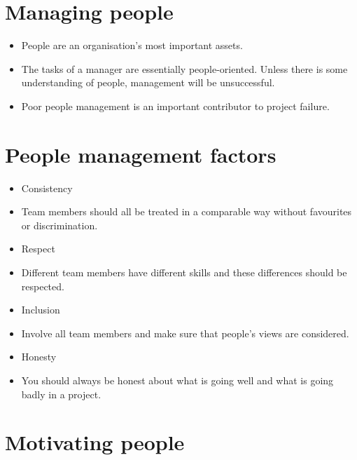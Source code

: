 \section{ Managing people}
\begin{itemize}

\item People are an organisation’s most important assets.

\item The tasks of a manager are essentially people-oriented. Unless there is some understanding of people, management will be unsuccessful.

\item Poor people management is an important contributor to project failure.
\end{itemize} \section{ People management factors}
\begin{itemize}

\item Consistency

  \item Team members should all be treated in a comparable way without favourites or discrimination.

\item Respect

  \item Different team members have different skills and these differences should be respected.

\item Inclusion

  \item Involve all team members and make sure that people’s views are considered.

\item Honesty

  \item You should always be honest about what is going well and what is going badly in a project.
\end{itemize} \section{ Motivating people}
